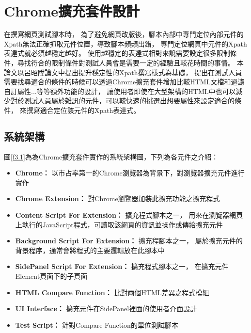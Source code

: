 \chapter{Chrome擴充套件設計}
\indent
在撰寫網頁測試腳本時，
為了避免網頁改版後，腳本內部中專門定位內部元件的Xpath無法正確抓取元件位置，導致腳本頻頻出錯，
專門定位網頁中元件的Xpath表達式就必須越穩定越好。
使用越穩定的表達式相對來說需要設定很多限制條件，尋找符合的限制條件對測試人員會是需要一定的經驗且較花時間的事情。
本論文以呂昭陞論文中提出提升穩定性的Xpath撰寫樣式為基礎，
提出在測試人員需要找尋適合的條件的時候可以透過Chrome擴充套件增加比較HTML文檔和過濾自訂屬性...等等額外功能的設計，
讓使用者即使在大型架構的HTML中也可以減少對於測試人員屬於雜訊的元件，可以較快速的挑選出想要屬性來設定適合的條件，
來撰寫適合定位該元件的Xpath表達式。

\section{系統架構}\label{s3.1}
圖\ref{f3.1}為為Chrome擴充套件實作的系統架構圖，下列為各元件之介紹：

\begin{itemize}
\item\textbf{Chrome：}
以市占率第一的Chrome瀏覽器為背景下，對瀏覽器擴充元件進行實作

\item\textbf{Chrome Extension：}
對Chrome瀏覽器加裝此擴充功能之擴充程式

\item\textbf{Content Script For Extension：}
擴充程式腳本之一， 用來在瀏覽器網頁上執行的JavaScript程式，可讀取該網頁的資訊並操作或傳給擴充元件

\item\textbf{Background Script For Extension：}
擴充程腳本之一， 屬於擴充元件的背景程序，通常會將程式的主要邏輯放在此腳本中

\item\textbf{SidePanel Script For Extension：}
擴充程式腳本之一， 在擴充元件Element頁面下的子頁面

\item\textbf{HTML Compare Function：}
比對兩個HTML差異之程式模組

\item\textbf{UI Interface：}
擴充元件在SidePanel裡面的使用者介面設計

\item\textbf{Test Script：}
針對Compare Function的單位測試腳本

\end{itemize}

